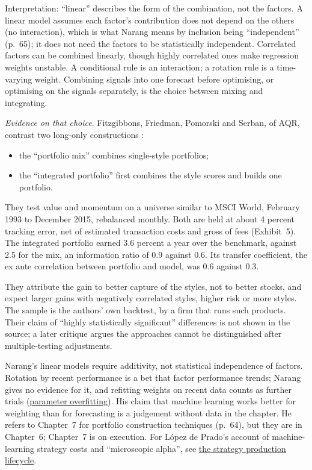 \begin{qfmethod}
 Interpretation: ``linear'' describes the form of the combination, not the factors. A linear model assumes each factor's contribution does not depend on the others (no interaction), which is what Narang means by inclusion being ``independent'' (p.~65); it does not need the factors to be statistically independent. Correlated factors can be combined linearly, though highly correlated ones make regression weights unstable. A conditional rule is an interaction; a rotation rule is a time-varying weight. Combining signals into one forecast before optimising, or optimising on the signals separately, is the choice between mixing and integrating.

\emph{Evidence on that choice}. Fitzgibbons, Friedman, Pomorski and Serban, of AQR, contrast two long-only constructions \citep[\emph{Journal of Investing} 26(4), Winter 2017, AQR-hosted reprint, pp.~1, 7 and~9]{eq-fitzgibbons-2017}:
\begin{itemize}
\item the ``portfolio mix'' combines single-style portfolios;
\item the ``integrated portfolio'' first combines the style scores and builds one portfolio.
\end{itemize}
They test value and momentum on a universe similar to MSCI World, February 1993 to December 2015, rebalanced monthly. Both are held at about 4 percent tracking error, net of estimated transaction costs and gross of fees (Exhibit~5). The integrated portfolio earned 3.6 percent a year over the benchmark, against 2.5 for the mix, an information ratio of 0.9 against 0.6. Its transfer coefficient, the ex ante correlation between portfolio and model, was 0.6 against 0.3.

They attribute the gain to better capture of the styles, not to better stocks, and expect larger gains with negatively correlated styles, higher risk or more styles. The sample is the authors' own backtest, by a firm that runs such products. Their claim of ``highly statistically significant'' differences is not shown in the source; a later critique argues the approaches cannot be distinguished after multiple-testing adjustments.

 Narang's linear models require additivity, not statistical independence of factors. Rotation by recent performance is a bet that factor performance trends; Narang gives no evidence for it, and refitting weights on recent data counts as further trials (\hyperref[pit:parameter-overfitting]{parameter overfitting}). His claim that machine learning works better for weighting than for forecasting is a judgement without data in the chapter. He refers to Chapter~7 for portfolio construction techniques (p.~64), but they are in Chapter~6; Chapter~7 is on execution. For López de Prado's account of machine-learning strategy costs and ``microscopic alpha'', see \hyperref[meth:strategy-production-lifecycle]{the strategy production lifecycle}.


\end{qfmethod}
